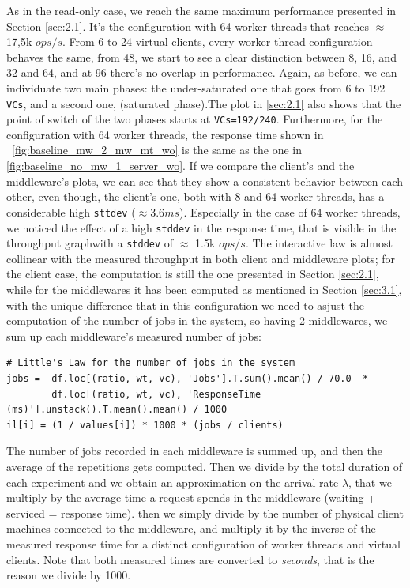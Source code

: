 \documentclass[11pt,a4paper]{article}
\begin{document}
As in the read-only case, we reach the same maximum performance presented in Section \ref{sec:2.1}. It's the configuration with 64 worker threads that reaches $\approx$ 17,5k $ops/s$. From 6 to 24 virtual clients, every worker thread configuration behaves the same, from 48, we start to see a clear distinction between 8, 16, and 32 and 64, and at 96 there's no overlap in performance. Again, as before, we can individuate two main phases: the under-saturated one that goes from 6 to 192 \texttt{VCs}, and a second one, (saturated phase).The plot in \ref{sec:2.1} also shows that the point of switch of the two phases starts at \texttt{VCs=192/240}. 
Furthermore, for the configuration with 64 worker threads, the response time shown in ~\ref{fig:baseline_mw_2_mw_mt_wo} is the same as the one in \ref{fig:baseline_no_mw_1_server_wo}.
If we compare the client's and the middleware's plots, we can see that they show a consistent behavior between each other, even though, the client's one, both with 8 and 64 worker threads, has a considerable high \texttt{sttdev} ($\approx 3.6ms$). Especially in the case of 64 worker threads, we noticed the effect of a high \texttt{stddev} in the response time, that is visible in the throughput graphwith a \texttt{stddev} of $\approx$ 1.5k $ops/s$.
The interactive law is almost collinear with the measured throughput in both client and middleware plots; for the client case, the computation is still the one presented in Section \ref{sec:2.1}, while for the middlewares it has been computed as mentioned in Section \ref{sec:3.1}, with the unique difference that in this configuration we need to asjust the computation of the number of jobs in the system, so having 2 middlewares, we sum up each middleware's measured number of jobs:

\begin{lstlisting}[]
# Little's Law for the number of jobs in the system
jobs =  df.loc[(ratio, wt, vc), 'Jobs'].T.sum().mean() / 70.0  * 
        df.loc[(ratio, wt, vc), 'ResponseTime (ms)'].unstack().T.mean().mean() / 1000
il[i] = (1 / values[i]) * 1000 * (jobs / clients) 
\end{lstlisting}

The number of jobs recorded in each middleware is summed up, and then the average of the repetitions gets computed. Then we divide by the total duration of each experiment and we obtain an approximation on the arrival rate $\lambda$, that we multiply by the average time a request spends in the middleware (waiting + serviced = response time). then we simply divide by the number of physical client machines connected to the middleware, and multiply it by the inverse of the measured response time for a distinct configuration of worker threads and virtual clients. Note that both measured times are converted to \textit{seconds}, that is the reason we divide by 1000.
\end{document}
